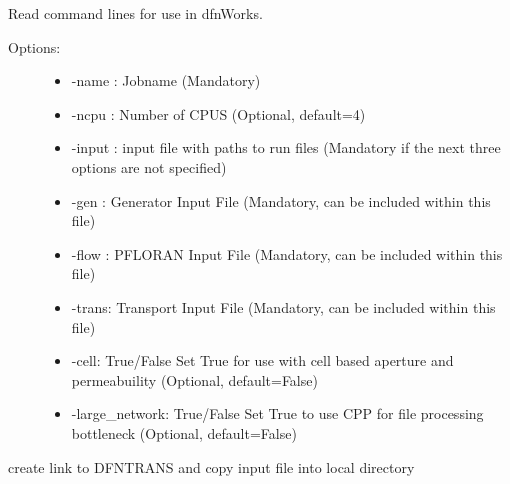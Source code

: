 \documentclass[letterpaper,10pt,english]{sphinxmanual}
\begin{document}
\begin{fulllineitems}
\begin{fulllineitems}
\begin{description}
\begin{itemize}
\end{itemize}

\end{description}

\end{fulllineitems}


\begin{fulllineitems}
\label{pydfnworks:pydfnworks.DFNWORKS.commandline_options}
Read command lines for use in dfnWorks.
\begin{description}
\item[{Options:}] \leavevmode\begin{itemize}
\item {} 
-name : Jobname (Mandatory)

\item {} 
-ncpu : Number of CPUS (Optional, default=4)

\item {} 
-input : input file with paths to run files (Mandatory if the next three options are not specified)

\item {} 
-gen : Generator Input File (Mandatory, can be included within this file)

\item {} 
-flow : PFLORAN Input File (Mandatory, can be included within this file)

\item {} 
-trans: Transport Input File (Mandatory, can be included within this file)

\item {} 
-cell: True/False Set True for use with cell based aperture and permeabuility (Optional, default=False)

\item {} 
-large\_network: True/False Set True to use CPP for file processing bottleneck (Optional, default=False)

\end{itemize}

\end{description}

\end{fulllineitems}


\begin{fulllineitems}
\label{pydfnworks:pydfnworks.DFNWORKS.copy_dfnTrans_files}
create link to DFNTRANS and copy input file into local directory


\end{fulllineitems}
\end{fulllineitems}
\end{document}
